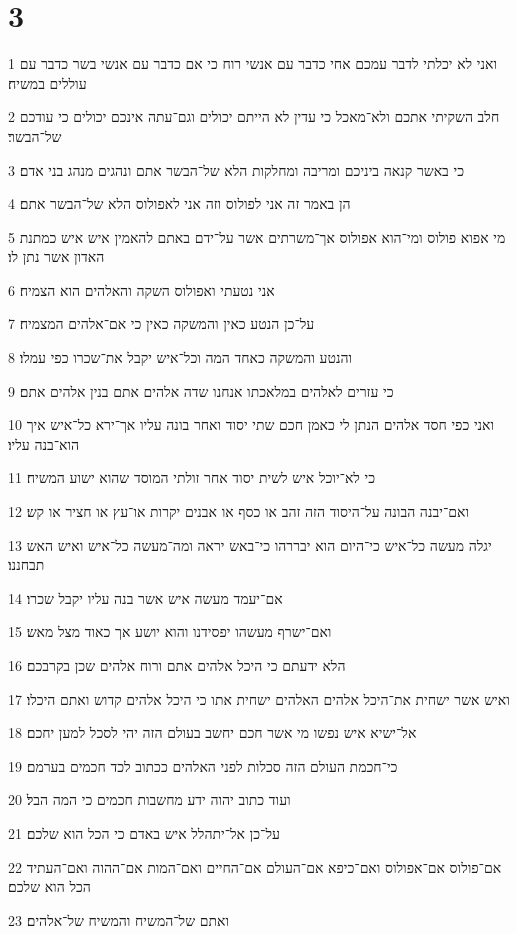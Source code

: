 \chapter{3}

\par 1 ואני לא יכלתי לדבר עמכם אחי כדבר עם אנשי רוח כי אם כדבר עם אנשי בשר כדבר עם עוללים במשיח׃
\par 2 חלב השקיתי אתכם ולא־מאכל כי עדין לא הייתם יכולים וגם־עתה אינכם יכולים כי עודכם של־הבשר׃
\par 3 כי באשר קנאה ביניכם ומריבה ומחלקות הלא של־הבשר אתם ונהגים מנהג בני אדם׃
\par 4 הן באמר זה אני לפולוס וזה אני לאפולוס הלא של־הבשר אתם׃
\par 5 מי אפוא פולוס ומי־הוא אפולוס אך־משרתים אשר על־ידם באתם להאמין איש איש כמתנת האדון אשר נתן לו׃
\par 6 אני נטעתי ואפולוס השקה והאלהים הוא הצמיח׃
\par 7 על־כן הנטע כאין והמשקה כאין כי אם־אלהים המצמיח׃
\par 8 והנטע והמשקה כאחד המה וכל־איש יקבל את־שכרו כפי עמלו׃
\par 9 כי עזרים לאלהים במלאכתו אנחנו שדה אלהים אתם בנין אלהים אתם׃
\par 10 ואני כפי חסד אלהים הנתן לי כאמן חכם שתי יסוד ואחר בונה עליו אך־ירא כל־איש איך הוא־בנה עליו׃
\par 11 כי לא־יוכל איש לשית יסוד אחר זולתי המוסד שהוא ישוע המשיח׃
\par 12 ואם־יבנה הבונה על־היסוד הזה זהב או כסף או אבנים יקרות או־עץ או חציר או קש׃
\par 13 יגלה מעשה כל־איש כי־היום הוא יבררהו כי־באש יראה ומה־מעשה כל־איש ואיש האש תבחננו׃
\par 14 אם־יעמד מעשה איש אשר בנה עליו יקבל שכרו׃
\par 15 ואם־ישרף מעשהו יפסידנו והוא יושע אך כאוד מצל מאש׃
\par 16 הלא ידעתם כי היכל אלהים אתם ורוח אלהים שכן בקרבכם׃
\par 17 ואיש אשר ישחית את־היכל אלהים האלהים ישחית אתו כי היכל אלהים קדוש ואתם היכלו׃
\par 18 אל־ישיא איש נפשו מי אשר חכם יחשב בעולם הזה יהי לסכל למען יחכם׃
\par 19 כי־חכמת העולם הזה סכלות לפני האלהים ככתוב לכד חכמים בערמם׃
\par 20 ועוד כתוב יהוה ידע מחשבות חכמים כי המה הבל׃
\par 21 על־כן אל־יתהלל איש באדם כי הכל הוא שלכם׃
\par 22 אם־פולוס אם־אפולוס ואם־כיפא אם־העולם אם־החיים ואם־המות אם־ההוה ואם־העתיד הכל הוא שלכם׃
\par 23 ואתם של־המשיח והמשיח של־אלהים׃

